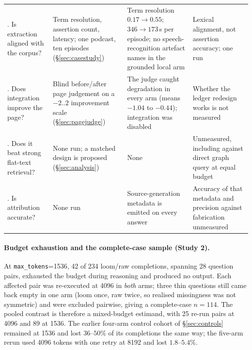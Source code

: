 \documentclass[10pt,twocolumn]{article}
\begin{document}
\begin{table}[t]
\begin{tabularx}{\textwidth}{@{}>{\raggedright\arraybackslash}p{2.9cm} >{\raggedright\arraybackslash}p{3.6cm} >{\raggedright\arraybackslash}X >{\raggedright\arraybackslash}p{4.3cm}@{}}
5. Is extraction aligned with the corpus? & Term resolution, assertion count, latency; one podcast, ten episodes (\S\ref{sec:casestudy}) & Term resolution $0.17\to0.55$; $346\to173$\,s per episode; no speech-recognition artefact names in the grounded local arm & Lexical alignment, not assertion accuracy; one run \\
6. Does integration improve the page? & Blind before/after page judgement on a $-2..2$ improvement scale (\S\ref{sec:pagejudge}) & The judge caught degradation in every arm (means $-1.04$ to $-0.44$); integration was disabled & Whether the ledger redesign works is not measured \\
7. Does it beat strong flat-text retrieval? & None run; a matched design is proposed (\S\ref{sec:analysis}) & None & Unmeasured, including against direct graph query at equal budget \\
8. Is attribution accurate? & None run & Source-generation metadata is emitted on every answer & Accuracy of that metadata and precision against fabrication unmeasured \\
\bottomrule
\end{tabularx}
\end{table}

\paragraph{Budget exhaustion and the complete-case sample (Study 2).} At \texttt{max\_tokens}=1536, 42 of 234 loom/raw completions, spanning 28 question pairs, exhausted the budget during reasoning and produced no output. Each affected pair was re-executed at 4096 in \emph{both} arms; three thin questions still came back empty in one arm (loom once, raw twice, so realised missingness was not symmetric) and were excluded pairwise, giving a complete-case $n=114$. The pooled contrast is therefore a mixed-budget estimand, with 25 re-run pairs at 4096 and 89 at 1536. The earlier four-arm control cohort of \S\ref{sec:controls} remained at 1536 and lost $36$--$50\%$ of its completions the same way; the five-arm rerun used 4096 tokens with one retry at 8192 and lost $1.8$--$5.4\%$.
\end{document}
